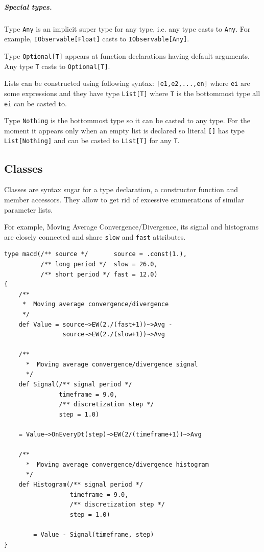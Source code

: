 \documentclass[a4paper,11pt]{article}
\begin{document}
\subparagraph{Special types.}


Type \texttt{Any} is an implicit super type for any type, i.e. any type
casts to \texttt{Any}. For example, \texttt{IObservable{[}Float{]}}
casts to \texttt{IObservable{[}Any{]}}.

Type \texttt{Optional{[}T{]}} appears at function declarations having
default arguments. Any type \texttt{T} casts to
\texttt{Optional{[}T{]}}.

Lists can be constructed using following syntax:
\texttt{{[}e1,e2,...,en{]}} where \texttt{ei} are some expressions and
they have type \texttt{List{[}T{]}} where \texttt{T} is the bottommost
type all \texttt{ei} can be casted to.

Type \texttt{Nothing} is the bottommost type so it can be casted to any
type. For the moment it appears only when an empty list is declared so
literal \texttt{{[}{]}} has type \texttt{List{[}Nothing{]}} and can be
casted to \texttt{List{[}T{]}} for any \texttt{T}.

\subsection{Classes}\label{classes}

Classes are syntax sugar for a type declaration, a constructor function and member accessors. They allow to get rid of excessive enumerations of similar parameter lists.

For example, Moving Average Convergence/Divergence, its signal and histograms are closely connected and share \texttt{slow} and \texttt{fast} attributes.

\begin{verbatim}
type macd(/** source */       source = .const(1.),
          /** long period */  slow = 26.0,
          /** short period */ fast = 12.0)
{
    /**
     *  Moving average convergence/divergence
     */
    def Value = source~>EW(2./(fast+1))~>Avg -
                source~>EW(2./(slow+1))~>Avg

    /**
      *  Moving average convergence/divergence signal
      */
    def Signal(/** signal period */        
               timeframe = 9.0,
               /** discretization step */   
               step = 1.0)

    = Value~>OnEveryDt(step)~>EW(2/(timeframe+1))~>Avg

    /**
      *  Moving average convergence/divergence histogram
      */
    def Histogram(/** signal period */
                  timeframe = 9.0,
                  /** discretization step */   
                  step = 1.0)

        = Value - Signal(timeframe, step)
}
\end{verbatim}
\end{document}
